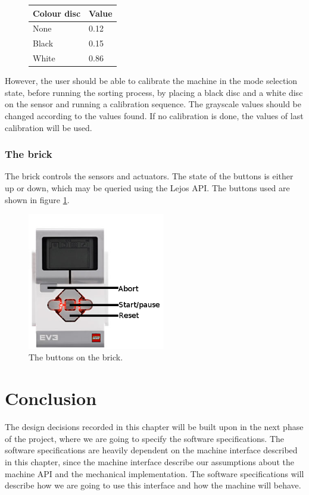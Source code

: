 \documentclass[a4paper,oneside,11pt]{article}
\begin{document}
\begin{figure}[H]
\begin{tabular}{|l|l|}
\hline
\textbf{Colour disc} & \textbf{Value} \\
\hline
None & 0.12 \\
Black & 0.15 \\
White & 0.86 \\
\hline
\end{tabular}
\end{figure}

However, the user should be able to calibrate the machine in the mode selection state, before running the sorting process, by placing a black disc and a white disc on the sensor and running a calibration sequence. The grayscale values should be changed according to the values found. If no calibration is done, the values of last calibration will be used.

\newpage

\subsubsection{The brick}
The brick controls the sensors and actuators. The state of the buttons is either
up or down, which may be queried using the Lejos API. The buttons used are shown in figure \ref{brickbuttons}.
\begin{figure}[H]
	\centering
	\includegraphics[width=60mm]{BrickButtons.png}
	\caption{\label{brickbuttons}The buttons on the brick.}
\end{figure}

\section{Conclusion}
The design decisions recorded in this chapter will be built upon in the next phase of the
project, where we are going to specify the software specifications. The software specifications
are heavily dependent on the machine interface described in this chapter, since the machine
interface describe our assumptions about the machine API and the mechanical implementation.
The software specifications will describe how we are going to use this interface and how the
machine will behave.
\end{document}
